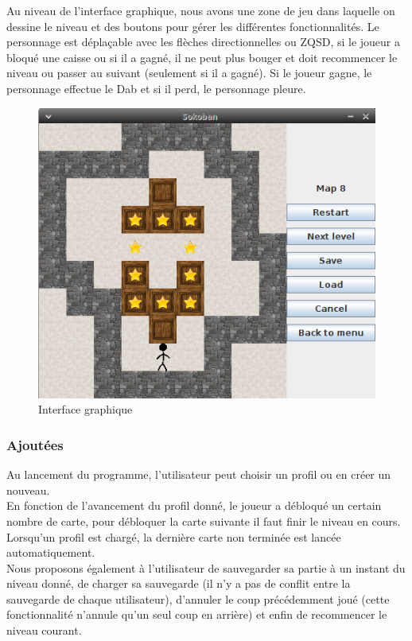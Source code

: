 \documentclass[a4paper,12pt]{article} %
\begin{document}
Au niveau de l'interface graphique, nous avons une zone de jeu dans laquelle on dessine le niveau et des boutons pour gérer les différentes fonctionnalités. Le personnage est déplaçable avec les flèches directionnelles ou ZQSD, si le joueur a bloqué une caisse ou si il a gagné, il ne peut plus bouger et doit recommencer le niveau ou passer au suivant (seulement si il a gagné). Si le joueur gagne, le personnage effectue le Dab et si il perd, le personnage pleure.


\begin{figure}[!h]
\centering
\includegraphics[scale=0.5]{images/Capture2.png}
\caption{Interface graphique}
\end{figure}

\subsubsection*{Ajoutées}

Au lancement du programme, l'utilisateur peut choisir un profil ou en créer un nouveau.\\
En fonction de l'avancement du profil donné, le joueur a débloqué un certain nombre de carte, pour débloquer la carte suivante il faut finir le niveau en cours. Lorsqu'un profil est chargé, la dernière carte non terminée est lancée automatiquement.\\

Nous proposons également à l'utilisateur de sauvegarder sa partie à un instant du niveau donné, de charger sa sauvegarde (il n'y a pas de conflit entre la sauvegarde de chaque utilisateur), d'annuler le coup précédemment joué (cette fonctionnalité n'annule qu'un seul coup en arrière) et enfin de recommencer le niveau courant.
\end{document}
